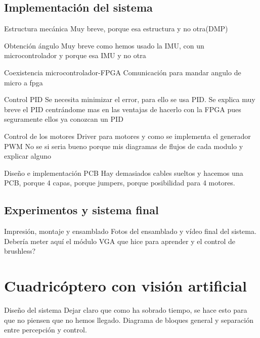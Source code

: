 \documentclass{beamer}
\begin{document}
\subsection{Implementación del sistema}
\begin{frame}{Estructura mecánica}
Muy breve, porque esa estructura y no otra(DMP) 
\end{frame}
\begin{frame}{Obtención ángulo}
Muy breve como hemos usado la IMU, con un microcontrolador y porque esa IMU y no otra
\end{frame}
\begin{frame}{Coexistencia microcontrolador-FPGA}
Comunicación para mandar angulo de micro a fpga
\end{frame}
\begin{frame}{Control PID}
Se necesita minimizar el error, para ello se usa PID.
Se explica muy breve el PID centrándome mas en las ventajas de hacerlo con la FPGA pues seguramente ellos ya conozcan un PID
\end{frame}
\begin{frame}{Control de los motores}
Driver para motores y como se implementa el generador PWM
No se si seria bueno porque mis diagramas de flujos de cada modulo y explicar alguno
\end{frame}
\begin{frame}{Diseño e implementación PCB}
Hay demasiados cables sueltos y hacemos una PCB, porque 4 capas, porque jumpers, porque posibilidad para 4 motores.
\end{frame}
\subsection{Experimentos y sistema final}
\begin{frame}{Impresión, montaje y ensamblado}
Fotos del ensamblado y vídeo final del sistema.
Debería meter aquí el módulo VGA que hice para aprender y el control de brushless?	
\end{frame}
\section{Cuadricóptero con visión artificial}
\begin{frame}{Diseño del sistema}
Dejar claro que como ha sobrado tiempo, se hace esto para que no piensen que no hemos llegado. Diagrama de bloques general y separación entre percepción y control.
\end{frame}
\end{document}
